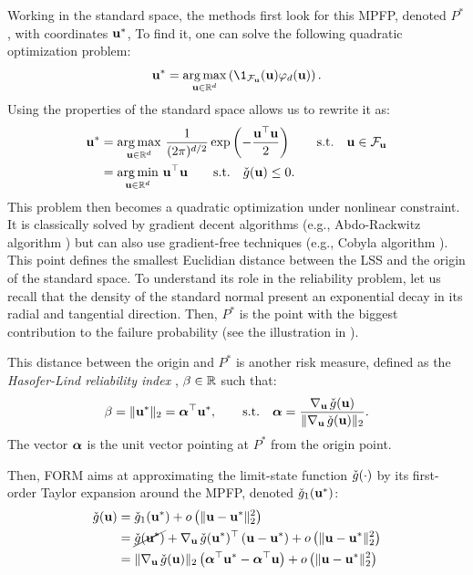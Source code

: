 Working in the standard space, the methods first look for this MPFP, denoted $P^*$, with coordinates ${\bf u}^*$, 
To find it, one can solve the following quadratic optimization problem: 
\begin{equation}
    \bu^* = \argmax_{\bu \in \R^d} \left(\1_{\iF_\bu}(\bu) \varphi_d(\bu)\right).
\end{equation}
Using the properties of the standard space allows us to rewrite it as: 
\begin{align}
    {\bf u}^* &= \operatorname*{arg\,max}_{{\bf u} \in \mathbb{R}^d} \, \frac{1}{(2\pi)^{d/2}} \exp\left(-\frac{{\bf u}^\top {\bf u} }{2} \right) \qquad \mathrm{s.t.} \quad {\bf u} \in \mathcal{F}_{{\bf u}}\\
          &= \operatorname*{arg\,min}_{{\bf u} \in \mathbb{R}^d} \, {\bf u}^\top {\bf u} \qquad \mathrm{s.t.} \quad \check{g}({\bf u}) \leq 0.
\end{align}
This problem then becomes a quadratic optimization under nonlinear constraint. 
It is classically solved by gradient decent algorithms (e.g., Abdo-Rackwitz algorithm \citealp{abdo_rack_1991}) but can also use gradient-free techniques (e.g., Cobyla algorithm \citealp{powell_1994}). 
This point defines the smallest Euclidian distance between the LSS and the origin of the standard space. 
To understand its role in the reliability problem, let us recall that the density of the standard normal present an exponential decay in its radial and tangential direction. 
Then, $P^*$ is the point with the biggest contribution to the failure probability (see the illustration in ). 

This distance between the origin and $P^*$ is another risk measure, defined as the \textit{Hasofer-Lind reliability index} \citep{lemaire_2013}, $\beta \in \mathbb{R}$ such that:
\begin{equation}
    \beta = \Vert {\bf u}^* \Vert_2 = {\boldsymbol{\alpha}} ^\top {\bf u}^*, \qquad \mathrm{s.t.} \quad
        {\boldsymbol{\alpha}} = \frac{\nabla_{{\bf u}} \,  \check{g}({\bf u})}{\Vert \nabla_{{\bf u}} \,  \check{g}({\bf u}) \Vert_2}.      
\end{equation}
The vector ${\boldsymbol{\alpha}}$ is the unit vector pointing at $P^*$ from the origin point. 

Then, FORM aims at approximating the limit-state function $\check{g}(\cdot)$ by its first-order Taylor expansion around the MPFP, denoted $\check{g}_1({\bf u}^*)$: 
\begin{equation}
    \begin{split}
        \check{g}({\bf u}) &= \check{g}_1({\bf u}^*) + o\left(\Vert {\bf u} - {\bf u}^* \Vert_2^2\right)\\
                 &= \cancel{\check{g}({\bf u}^*)} + \nabla_{{\bf u}} \,  \check{g}({\bf u}^*)^\top \left({\bf u} -{\bf u}^* \right) + o\left(\Vert {\bf u} - {\bf u}^* \Vert_2^2\right)\\
                 &= \Vert \nabla_{{\bf u}} \, \check{g}({\bf u}) \Vert_2 \left({\boldsymbol{\alpha}}^\top {\bf u}^* - {\boldsymbol{\alpha}}^\top {\bf u} \right) + o\left(\Vert {\bf u} - {\bf u}^* \Vert_2^2\right)
    \end{split}    
\end{equation}
 
